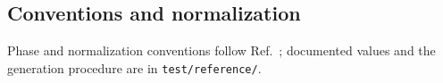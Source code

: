 \documentclass[aps,onecolumn,10pt,superscriptaddress,floatfix,nofootinbib]{revtex4}
\begin{document}

\subsection{Conventions and normalization}
\label{sub:conv}
Phase and normalization conventions follow Ref.~\cite{Dang2024EPJP2}; documented
values and the generation procedure are in \verb|test/reference/|.
\end{document}
